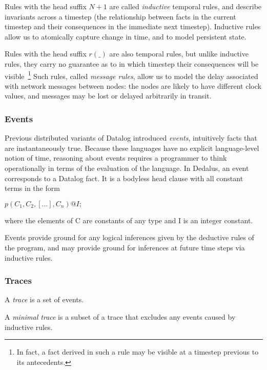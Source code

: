 \documentclass{acm_proc_article-sp-sigmod09}
\begin{document}
Rules with the head suffix $N + 1$ are called \emph{inductive} temporal rules,
and describe invariants across a timestep (the relationship between facts in
the current timestep and their consequences in the immediate next timestep).
Inductive rules allow us to atomically capture change in time, and to model
persistent state.

Rules with the head suffix $r(\_)$ are also temporal rules, but unlike
inductive rules, they carry no guarantee as to in which timestep their
consequences will be visible~\footnote{In fact, a fact derived in such a rule
may be visible at a timestep previous to its antecedents.} Such rules, called
{\em message rules}, allow us to model the delay associated with network
messages between nodes: the nodes are likely to have different clock values,
and messages may be lost or delayed arbitrarily in transit.


\subsubsection{Events}

Previous distributed variants of Datalog introduced {\em events}, intuitively
facts that are instantaneously true.  Because these languages have no explicit
language-level notion of time, reasoning about events requires a programmer to
think operationally in terms of the evaluation of the language.  In Dedalus,
an event corresponds to a Datalog fact.  It is a bodyless head clause with all 
constant terms in the form


$p(C_{1},C_{2},[...],C_{n})@I;$


where the elements of C are constants of any type and I is an integer constant.

Events provide ground for any logical inferences given by the deductive rules of the program, and may provide ground for inferences at 
future time steps via inductive rules.


\subsubsection{Traces}

\begin{definition}
A \emph{trace} is a set of events.
\end{definition}

\begin{definition}
A \emph{minimal trace} is a subset of a trace that excludes any events caused by inductive rules.
\end{definition}
\end{document}
